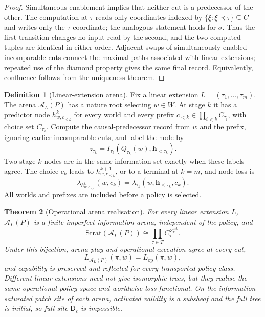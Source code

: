 \documentclass[11pt]{article}
\theoremstyle{plain}
\newtheorem{theorem}{Theorem}[section]
\theoremstyle{definition}
\newtheorem{definition}[theorem]{Definition}
\theoremstyle{remark}
\newcommand{\eps}{\varepsilon}
\begin{document}
\begin{proof}
Simultaneous enablement implies that neither cut is a predecessor of the other.
The computation at $\tau$ reads only coordinates indexed by
$\{\xi:\xi\prec\tau\}\subseteq C$ and writes only the $\tau$ coordinate;
the analogous statement holds for $\sigma$. Thus the first transition changes
no input read by the second, and the two computed tuples are identical in either
order. Adjacent swaps of simultaneously enabled incomparable cuts connect the
maximal paths associated with linear extensions; repeated use of the diamond
property gives the same final record. Equivalently, confluence follows from the
uniqueness theorem.
\end{proof}

\begin{definition}[Linear-extension arena]
\label{def:operational-arena}
Fix a linear extension $L=(\tau_1,\ldots,\tau_m)$. The arena
$\mathcal A_L(P)$ has a nature root selecting $w\in W$. At stage $k$ it has a
predictor node $h^k_{w,c_{<k}}$ for every world and every prefix
$c_{<k}\in\prod_{i<k}C_{\tau_i}$, with choice set $C_{\tau_k}$. Compute the
causal-predecessor record from $w$ and the prefix, ignoring earlier incomparable
cuts, and label the node by
\[
z_{\tau_k}=I_{\tau_k}(Q_{\tau_k}(w),\mathbf h_{<\tau_k}).
\]
Two stage-$k$ nodes are in the same information set exactly when these labels
agree. The choice $c_k$ leads to $h^{k+1}_{w,c_{\le k}}$, or to a terminal at
$k=m$, and node loss is
\[
\lambda_{h^k_{w,c_{<k}}}(w,c_k)
=\lambda_{\tau_k}(w,\mathbf h_{<\tau_k},c_k).
\]
All worlds and prefixes are included before a policy is selected.
\end{definition}

\begin{theorem}[Operational arena realisation]
\label{thm:operational-arena}
For every linear extension $L$, $\mathcal A_L(P)$ is a finite
imperfect-information arena, independent of the policy, and
\[
\mathrm{Strat}(\mathcal A_L(P))
\cong\prod_{\tau\in T}C_\tau^{Z_\tau^{\mathrm{act}}}.
\]
Under this bijection, arena play and operational execution agree at every cut,
\[
L_{\mathcal A_L(P)}(\pi,w)=L_{\mathrm{op}}(\pi,w),
\]
and capability is preserved and reflected for every transported policy class.
Different linear extensions need not give isomorphic trees, but they realise the
same operational policy space and worldwise loss functional. On the
information-saturated patch site of each arena, activated validity is a
subsheaf and the full tree is initial, so full-site
$\mathsf D_\eps$ is impossible.
\end{theorem}
\end{document}
